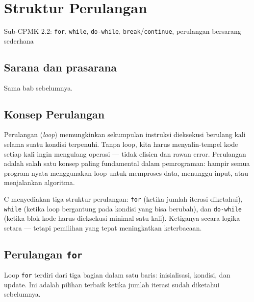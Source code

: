 \documentclass[../main.tex]{subfiles}
\begin{document}
\chapter{Struktur Perulangan}

\begin{subcpmk}
  \item Sub-CPMK 2.2: \texttt{for}, \texttt{while}, \texttt{do-while}, \texttt{break}/\texttt{continue}, perulangan bersarang sederhana
\end{subcpmk}


\section{Sarana dan prasarana}
Sama bab sebelumnya.

\section{Konsep Perulangan}

Perulangan (\textit{loop}) memungkinkan sekumpulan instruksi dieksekusi berulang kali selama suatu kondisi terpenuhi. Tanpa loop, kita harus menyalin-tempel kode setiap kali ingin mengulang operasi --- tidak efisien dan rawan error. Perulangan adalah salah satu konsep paling fundamental dalam pemrograman: hampir semua program nyata menggunakan loop untuk memproses data, menunggu input, atau menjalankan algoritma.

C menyediakan tiga struktur perulangan: \texttt{for} (ketika jumlah iterasi diketahui), \texttt{while} (ketika loop bergantung pada kondisi yang bisa berubah), dan \texttt{do-while} (ketika blok kode harus dieksekusi minimal satu kali). Ketiganya secara logika setara --- tetapi pemilihan yang tepat meningkatkan keterbacaan.

\section{Perulangan \texttt{for}}

Loop \texttt{for} terdiri dari tiga bagian dalam satu baris: inisialisasi, kondisi, dan update. Ini adalah pilihan terbaik ketika jumlah iterasi sudah diketahui sebelumnya.
\end{document}
